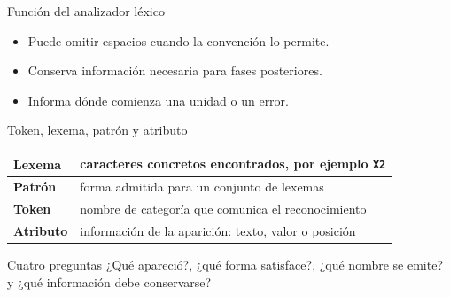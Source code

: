 \documentclass[11pt,spanish]{beamer}
\begin{document}
\begin{frame}{Función del analizador léxico}
\vfill

\begin{center}
\end{center}

\bigskip

\begin{itemize}
  \item Puede omitir espacios cuando la convención lo permite.
  \item Conserva información necesaria para fases posteriores.
  \item Informa dónde comienza una unidad o un error.
\end{itemize}

\vfill
\end{frame}

\begin{frame}{Token, lexema, patrón y atributo}
\vfill

\begin{center}
\small
\renewcommand{\arraystretch}{1.35}
\begin{tabular}{|L{.18\textwidth}|L{.68\textwidth}|}
\hline
\textbf{Lexema} & caracteres concretos encontrados, por ejemplo \texttt{X2} \\
\hline
\textbf{Patrón} & forma admitida para un conjunto de lexemas \\
\hline
\textbf{Token} & nombre de categoría que comunica el reconocimiento \\
\hline
\textbf{Atributo} & información de la aparición: texto, valor o posición \\
\hline
\end{tabular}
\end{center}

\bigskip

\begin{block}{Cuatro preguntas}
¿Qué apareció?, ¿qué forma satisface?, ¿qué nombre se emite? y ¿qué información debe conservarse?
\end{block}

\vfill
\end{frame}
\end{document}

